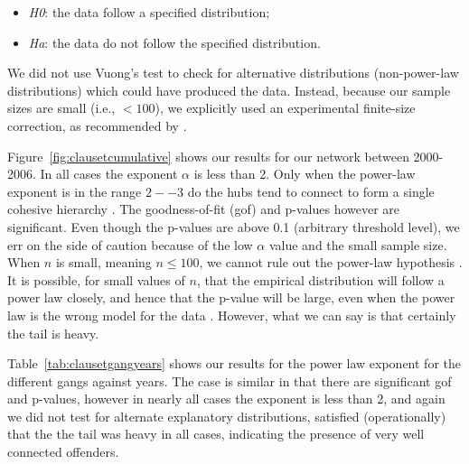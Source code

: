 \documentclass[twocolumn]{svjour3}          %
\theoremstyle{definition}
\begin{document}
\begin{itemize}
\item \emph{H0}: the data follow a specified distribution;
\item \emph{Ha}: the data do not follow the specified distribution. 
\end{itemize}

We did not use Vuong's test to check for alternative distributions
(non-power-law distributions) which could have produced the
data. Instead, because our sample sizes are small (i.e., $< 100$), we
explicitly used an experimental finite-size correction, as recommended
by \citet{ClausetShaliziNewman2009}.

Figure~\ref{fig:clausetcumulative} shows our results for our network
between 2000-2006. In all cases the exponent $\alpha$ is less than
2. Only when the power-law exponent is in the range $2--3$ do the hubs
tend to connect to form a single cohesive hierarchy
\citep{AdamicLukoseHuberman2003}.  The goodness-of-fit (gof) and
p-values however are significant. Even though the p-values are above
0.1 (arbitrary threshold level), we err on the side of caution because
of the low $\alpha$ value and the small sample size. When $n$ is
small, meaning $n \leq 100$, we cannot rule out the power-law
hypothesis \citep{ClausetShaliziNewman2009}. It is possible, for small
values of $n$, that the empirical distribution will follow a power law
closely, and hence that the p-value will be large, even when the power
law is the wrong model for the data
\citep{ClausetShaliziNewman2009}. However, what we can say is that
certainly the tail is heavy.

Table~\ref{tab:clausetgangyears} shows our results for the power law
exponent for the different gangs against years. The case is similar in
that there are significant gof and p-values, however in nearly all
cases the exponent is less than 2, and again we did not test for
alternate explanatory distributions, satisfied (operationally) that
the the tail was heavy in all cases, indicating the presence of very
well connected offenders.
\end{document}
